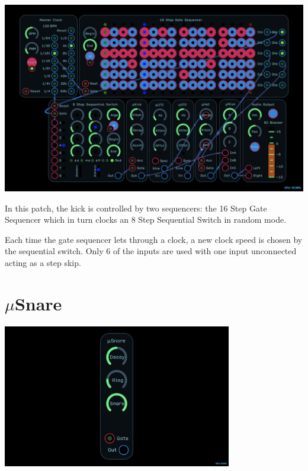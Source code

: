 \documentclass[11pt]{book}
\begin{document}
\begin{multicols*}{2}
\begin{center}
\includegraphics[width=0.95\linewidth]{ukick-fig3.png}
\end{center}

In this patch, the kick is controlled by two sequencers: the 16 Step Gate Sequencer which in turn clocks an 8 Step Sequential Switch in random mode. 

Each time the gate sequencer lets through a clock, a new clock speed is chosen by the sequential switch. Only 6 of the inputs are used with one input unconnected acting as a step skip.

\end{multicols*}

\pagebreak


\section{$\mu$Snare}

\begin{center}
\includegraphics[width=0.75\textwidth]{usnare.png}
\end{center}
\end{document}
